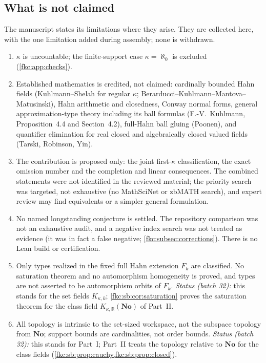 \documentclass[11pt,letterpaper]{article}
\numberwithin{equation}{section}
\theoremstyle{definition}
\theoremstyle{remark}
\newcommand{\R}{\mathbb R}
\newcommand{\No}{\mathbf{No}}
\newcommand{\K}{K_{\kappa,k}}
\newcommand{\KN}[2]{K_{#1,#2}(\No)}%
\begin{document}
\subsection{What is not claimed}
\label{fkc:subsec:nonclaims}
The manuscript states its limitations where they arise. They are collected here, with the one limitation added during assembly; none is withdrawn.
\begin{enumerate}[label=\textup{N\arabic*.}, leftmargin=2.6em]
\item $\kappa$ is uncountable; the finite-support case $\kappa=\aleph_0$ is excluded (\cref{fkc:app:checks}).
\item Established mathematics is credited, not claimed: cardinally bounded Hahn fields (Kuhlmann--Shelah for regular $\kappa$; Berarducci--Kuhlmann--Mantova--Matusinski), Hahn arithmetic and closedness, Conway normal forms, general approximation-type theory including its ball formulas (F.-V.~Kuhlmann, Proposition~4.4 and Section~4.2), full-Hahn ball gluing (Poonen), and quantifier elimination for real closed and algebraically closed valued fields (Tarski, Robinson, Yin).
\item The contribution is proposed only: the joint first-$\kappa$ classification, the exact omission number and the completion and linear consequences. The combined statements were not identified in the reviewed material; the priority search was targeted, not exhaustive (no MathSciNet or zbMATH search), and expert review may find equivalents or a simpler general formulation.
\item No named longstanding conjecture is settled. The repository comparison was not an exhaustive audit, and a negative index search was not treated as evidence (it was in fact a false negative; \cref{fkc:subsec:corrections}). There is no Lean build or certification.
\item Only types realized in the fixed full Hahn extension $F_k$ are classified. No saturation theorem and no automorphism homogeneity is proved, and types are not asserted to be automorphism orbits of $F_k$. \emph{Status (batch 32):} this stands for the set fields $\K$; \cref{fkc:sb:cor:saturation} proves the saturation theorem for the class field $\KN\kappa\R$ of Part~II.
\item All topology is intrinsic to the set-sized workspace, not the subspace topology from $\No$; support bounds are cardinalities, not order bounds. \emph{Status (batch 32):} this stands for Part~I; Part~II treats the topology relative to $\No$ for the class fields (\cref{fkc:sb:prop:cauchy,fkc:sb:prop:closed}).

\end{enumerate}
\end{document}
